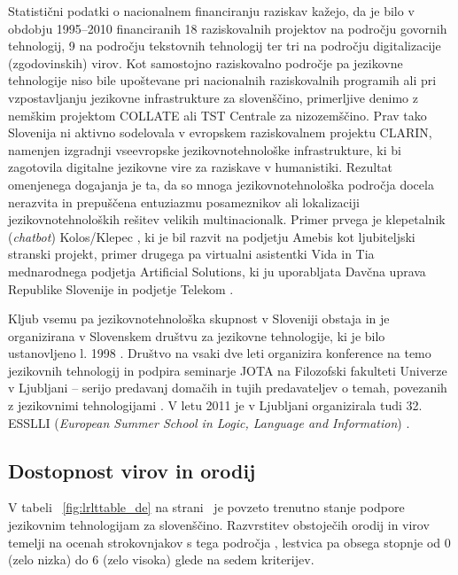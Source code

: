 \begin{multicols}{2}
Statistični podatki o nacionalnem financiranju raziskav kažejo, da je bilo v obdobju 1995--2010 financiranih 18 raziskovalnih projektov na področju govornih tehnologij, 9 na področju teks\-tovnih tehnologij ter tri na področju digitalizacije (zgodovinskih) virov. Kot samostojno raziskovalno področje pa jezikovne tehnologije niso bile upoštevane pri nacionalnih raziskovalnih programih ali pri vzpostavljanju jezikovne infrastrukture za slovenščino, primerljive denimo z nemškim projektom COLLATE ali TST Centrale za nizozemščino. Prav tako Slovenija ni aktivno sodelovala v evropskem raziskovalnem projektu CLARIN, namenjen izgradnji vseevropske jezikovnotehnološke infrastrukture, ki bi zagotovila digitalne jezikovne vire za raziskave v humanistiki. Rezultat omenjenega dogajanja je ta, da so mnoga jezikovnotehnološka področja docela ne\-razvita in prepuščena entuziazmu posameznikov ali lokalizaciji jezikovnotehnoloških rešitev velikih multinacionalk. Primer prvega je klepetalnik (\textit{chatbot}) Kolos/Klepec \cite{Amb7}, ki je bil razvit na podjetju Amebis kot ljubiteljski stranski projekt,  primer drugega pa virtualni asistentki Vida in Tia mednaro\-dnega podjetja Artificial Solutions, ki ju uporabljata Davčna uprava Republike Slovenije in podjetje Telekom \cite{Chat1}. 

Kljub vsemu pa jezikovnotehnološka skupnost v Sloveniji obstaja in je organizirana v Slovenskem društvu za jezikovne tehnologije, ki je bilo ustanov\-ljeno l. 1998 \cite{SDJT1}.  Društvo na vsaki dve leti organizira konference na temo jezikovnih tehnologij in podpira seminarje JOTA na Filozofski fakulteti Univerze v Ljubljani – serijo predavanj domačih in tujih predavateljev o temah, povezanih z jezikov\-nimi tehnologijami \cite{Jota1}. V letu 2011 je v Ljubljani organizirala tudi 32. ESSLLI (\textit{European Summer School in Logic, Language and Information}) \cite{ESSLLI1}. 

\subsection{Dostopnost virov in orodij}

V tabeli ~\ref{fig:lrlttable_de} na strani~\pageref{fig:lrlttable_de} je povzeto trenutno stanje podpore jezikovnim tehnologijam za slovenščino. Razvrstitev obstoječih orodij in virov temelji na ocenah strokovnjakov s tega področja \cite{expert1}, lestvica pa obsega stopnje od 0 (zelo nizka) do 6 (zelo visoka) glede na sedem kriterijev. 


\end{multicols}
